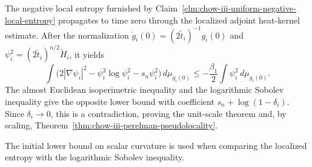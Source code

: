 \begin{theorem}
\label{thm:chow-iii-pseudolocality-log-sobolev-contradiction}
The negative local entropy furnished by Claim~\ref{clm:chow-iii-uniform-negative-local-entropy}
propagates to time zero through the localized adjoint heat-kernel estimate.  After
the normalization \(\dot g_i(0)=(2\widetilde t_i)^{-1}g_i(0)\) and
\(\psi_i^2=(2\widetilde t_i)^{n/2}\widetilde H_i\), it yields
\[
\int\bigl(2|\nabla\psi_i|^2-\psi_i^2\log\psi_i^2-s_n\psi_i^2\bigr)
\,d\mu_{\dot g_i(0)}\le-\frac{\beta_1}{2}\int\psi_i^2\,d\mu_{\dot g_i(0)}.
\]
The almost Euclidean isoperimetric inequality and the logarithmic Sobolev
inequality give the opposite lower bound with coefficient
\(s_n+\log(1-\delta_i)\).  Since \(\delta_i\to0\), this is a contradiction,
proving the unit-scale theorem and, by scaling, Theorem~\ref{thm:chow-iii-perelman-pseudolocality}.
\end{theorem}

\begin{remark}
\label{rem:chow-iii-pseudolocality-scalar-role}
The initial lower bound on scalar curvature is used when comparing the localized
entropy with the logarithmic Sobolev inequality.
\end{remark}
